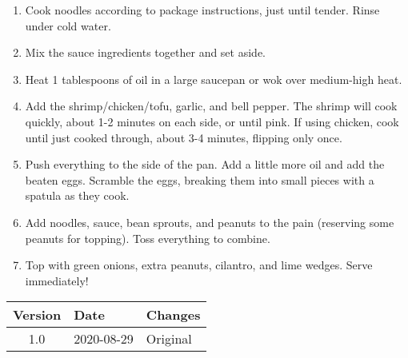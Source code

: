 \begin{enumerate}
    \item Cook noodles according to package instructions, just until tender. Rinse under cold water.
    \item Mix the sauce ingredients together and set aside.
    \item Heat 1 tablespoons of oil in a large saucepan or wok over medium-high heat.
    \item Add the shrimp/chicken/tofu, garlic, and bell pepper. The shrimp will cook quickly, about 1-2 minutes on each side, or until pink. If using chicken, cook until just cooked through, about 3-4 minutes, flipping only once.
    \item Push everything to the side of the pan. Add a little more oil and add the beaten eggs. Scramble the eggs, breaking them into small pieces with a spatula as they cook.
    \item Add noodles, sauce, bean sprouts, and peanuts to the pain (reserving some peanuts for topping). Toss everything to combine.
    \item Top with green onions, extra peanuts, cilantro, and lime wedges. Serve immediately!
\end{enumerate}

\vfill

\begin{tabular}{ c | l | l }
  \textbf{Version} & \textbf{Date} & \textbf{Changes} \\ 
  \hline		
  1.0 & 2020-08-29 & Original \\
\end{tabular}



